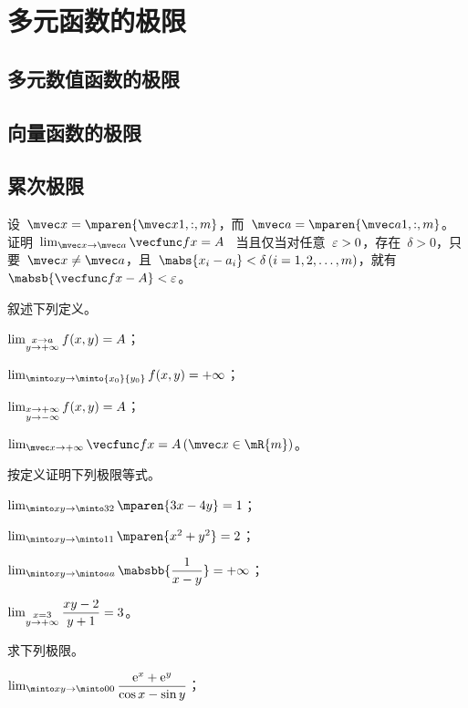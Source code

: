 \section{多元函数的极限}
\subsection{多元数值函数的极限}
\subsection{向量函数的极限}
\subsection{累次极限}
\begin{exercise}
\item 设~$\mvec x=\mparen{\mvec x{1,:,m}}$，而~$\mvec a=\mparen{\mvec a{1,:,m}}$。证明~$\lim_{\mvec x\to\mvec a}\vecfunc f{x}=A$~
当且仅当对任意~$\varepsilon>0$，存在~$\delta>0$，只要~$\mvec x\neq\mvec a$，且~$\mabs{x_i-a_i}<\delta\mcond{i=1,2,\dotsc,m}$，就有
~$\mabsb{\vecfunc f{x}-A}<\e$。
\item 叙述下列定义。
\begin{exlistcols}
  \item $\lim_{\substack{x\to a\\ y\to{+\infty}}}f(x,y)=A$；
  \item $\lim_{\minto xy\to\minto{x_0}{y_0}}f(x,y)=\pinf$；
  \item $\lim_{\substack{x\to{+\infty}\\ y\to{-\infty}}}f(x,y)=A$；
  \item $\lim_{\mvec x\to\pinf}\vecfunc f{x}=A\mcond{\mvec x\in\mR{m}}$。
\end{exlistcols}
\item 按定义证明下列极限等式。
\begin{exlistcols}
  \item $\lim_{\minto xy\to\minto 32}\mparen{3x-4y}=1$；
  \item $\lim_{\minto xy\to\minto 11}\mparen{x^2+y^2}=2$；
  \item $\lim_{\minto xy\to\minto aa}\mabsbb{\dfrac1{x-y}}=\pinf$；
  \item $\lim_{\substack{x=3\\ y\to{+\infty}}}\dfrac{xy-2}{y+1}=3$。
\end{exlistcols}
\item 求下列极限。
\begin{exlistcols}
  \item $\lim_{\minto xy\to\minto 00}\dfrac{\me^x+\me^y}{\cos x-\sin y}$；

\end{exlistcols}
\end{exercise}
